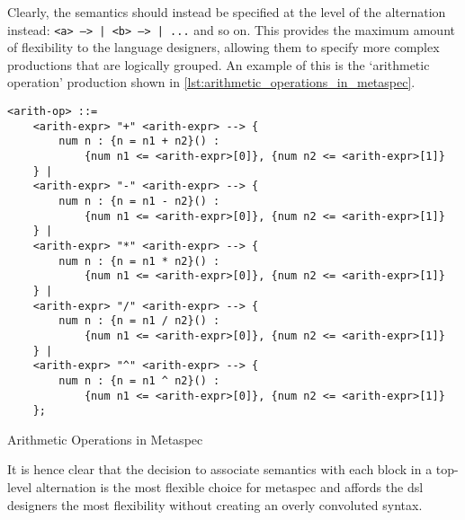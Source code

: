 Clearly, the semantics should instead be specified at the level of the alternation instead: \texttt{<a> --> {} | <b> --> {} | ...} and so on.
This provides the maximum amount of flexibility to the language designers, allowing them to specify more complex productions that are logically grouped. An example of this is the `arithmetic operation' production shown in \autoref{lst:arithmetic_operations_in_metaspec}.

\begin{listing}[!htb]
\begin{verbatim} 
<arith-op> ::=
    <arith-expr> "+" <arith-expr> --> {
        num n : {n = n1 + n2}() :
            {num n1 <= <arith-expr>[0]}, {num n2 <= <arith-expr>[1]}
    } |
    <arith-expr> "-" <arith-expr> --> {
        num n : {n = n1 - n2}() :
            {num n1 <= <arith-expr>[0]}, {num n2 <= <arith-expr>[1]}
    } |
    <arith-expr> "*" <arith-expr> --> {
        num n : {n = n1 * n2}() :
            {num n1 <= <arith-expr>[0]}, {num n2 <= <arith-expr>[1]}
    } |
    <arith-expr> "/" <arith-expr> --> {
        num n : {n = n1 / n2}() :
            {num n1 <= <arith-expr>[0]}, {num n2 <= <arith-expr>[1]}
    } |
    <arith-expr> "^" <arith-expr> --> {
        num n : {n = n1 ^ n2}() :
            {num n1 <= <arith-expr>[0]}, {num n2 <= <arith-expr>[1]}
    };
\end{verbatim}
\caption{Arithmetic Operations in Metaspec}
\label{lst:arithmetic_operations_in_metaspec}
\end{listing}

It is hence clear that the decision to associate semantics with each block in a top-level alternation is the most flexible choice for \gls{metaspec} and affords the \gls{dsl} designers the most flexibility without creating an overly convoluted syntax. 



